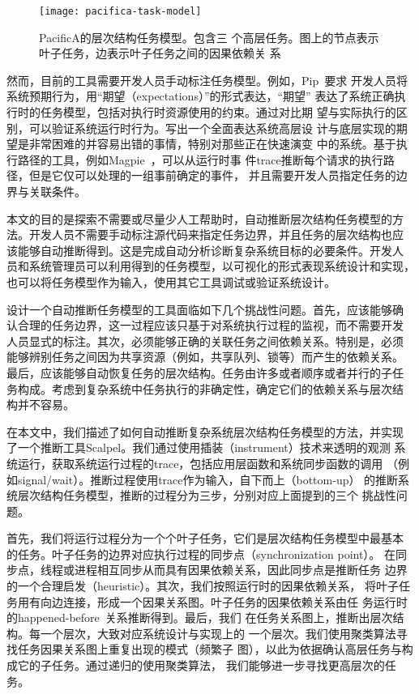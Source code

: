 \begin{figure}[htbp]
  \centering
  \begin{minipage}{1.0\linewidth}
    \centering
    \texttt{[image: pacifica-task-model]}
    \parbox{0.8\linewidth}{\caption{PacificA的层次结构任务模型。包含三
    个高层任务。图上的节点表示叶子任务，边表示叶子任务之间的因果依赖关
    系}
    \label{fig:pacifica_model}}
  \end{minipage}
\end{figure}

然而，目前的工具需要开发人员手动标注任务模型。例如，Pip~\cite{pip}要求
开发人员将系统预期行为，用“期望（expectations）”的形式表达，“期望”
表达了系统正确执行时的任务模型，包括对执行时资源使用的约束。通过对比期
望与实际执行的区别，可以验证系统运行时行为。写出一个全面表达系统高层设
计与底层实现的期望是非常困难的并容易出错的事情，特别对那些正在快速演变
中的系统。基于执行路径的工具，例如Magpie~\cite{magpie}，可以从运行时事
件trace推断每个请求的执行路径，但是它仅可以处理的一组事前确定的事件，
并且需要开发人员指定任务的边界与关联条件。

本文的目的是探索不需要或尽量少人工帮助时，自动推断层次结构任务模型的方
法。开发人员不需要手动标注源代码来指定任务边界，并且任务的层次结构也应
该能够自动推断得到。这是完成自动分析诊断复杂系统目标的必要条件。开发人
员和系统管理员可以利用得到的任务模型，以可视化的形式表现系统设计和实现，
也可以将任务模型作为输入，使用其它工具调试或验证系统设计。

设计一个自动推断任务模型的工具面临如下几个挑战性问题。首先，应该能够确
认合理的任务边界，这一过程应该只基于对系统执行过程的监视，而不需要开发
人员显式的标注。其次，必须能够正确的关联任务之间依赖关系。特别是，必须
能够辨别任务之间因为共享资源（例如，共享队列、锁等）而产生的依赖关系。
最后，应该能够自动恢复任务的层次结构。任务由许多或者顺序或者并行的子任
务构成。考虑到复杂系统中任务执行的非确定性，确定它们的依赖关系与层次结
构并不容易。

在本文中，我们描述了如何自动推断复杂系统层次结构任务模型的方法，并实现
了一个推断工具Scalpel。我们通过使用插装（instrument）技术来透明的观测
系统运行，获取系统运行过程的trace，包括应用层函数和系统同步函数的调用
（例如signal/wait）。推断过程使用trace作为输入，自下而上（bottom-up）
的推断系统层次结构任务模型，推断的过程分为三步，分别对应上面提到的三个
挑战性问题。

首先，我们将运行过程分为一个个叶子任务，它们是层次结构任务模型中最基本
的任务。叶子任务的边界对应执行过程的同步点（synchronization point）。
在同步点，线程或进程相互同步从而具有因果依赖关系，因此同步点是推断任务
边界的一个合理启发（heuristic）。其次，我们按照运行时的因果依赖关系，
将叶子任务用有向边连接，形成一个因果关系图。叶子任务的因果依赖关系由任
务运行时的happened-before~\cite{lamport_clock}关系推断得到。最后，我们
在任务关系图上，推断出层次结构。每一个层次，大致对应系统设计与实现上的
一个层次。我们使用聚类算法寻找任务因果关系图上重复出现的模式（频繁子
图），以此为依据确认高层任务与构成它的子任务。通过递归的使用聚类算法，
我们能够进一步寻找更高层次的任务。

